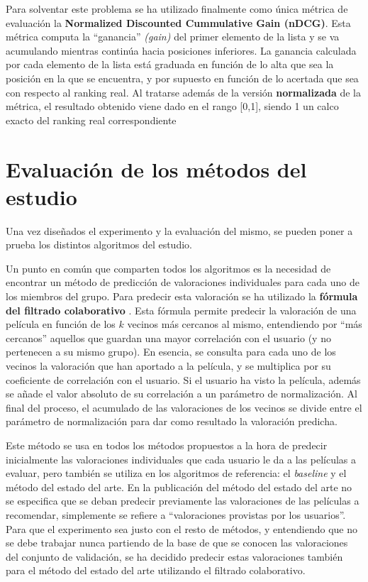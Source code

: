 Para solventar este problema se ha utilizado finalmente como única métrica de evaluación la \textbf{Normalized Discounted Cummulative Gain (nDCG)}. Esta métrica computa la ``ganancia'' \textit{(gain)} del primer elemento de la lista y se va acumulando mientras continúa hacia posiciones inferiores. La ganancia calculada por cada elemento de la lista está graduada en función de lo alta que sea la posición en la que se encuentra, y por supuesto en función de lo acertada que sea con respecto al ranking real. Al tratarse además de la versión \textbf{normalizada} de la métrica, el resultado obtenido viene dado en el rango [0,1], siendo 1 un calco exacto del ranking real correspondiente

\section{Evaluación de los métodos del estudio}

Una vez diseñados el experimento y la evaluación del mismo, se pueden poner a prueba los distintos algoritmos del estudio.

Un punto en común que comparten todos los algoritmos es la necesidad de encontrar un método de predicción de valoraciones individuales para cada uno de los miembros del grupo. Para predecir esta valoración se ha utilizado la \textbf{fórmula del filtrado colaborativo} \cite{recuperacion-informacion}. Esta fórmula permite predecir la valoración de una película en función de los $k$ vecinos más cercanos al mismo, entendiendo por ``más cercanos'' aquellos que guardan una mayor correlación con el usuario (y no pertenecen a su mismo grupo). En esencia, se consulta para cada uno de los vecinos la valoración que han aportado a la película, y se multiplica por su coeficiente de correlación con el usuario. Si el usuario ha visto la película, además se añade el valor absoluto de su correlación a un parámetro de normalización. Al final del proceso, el acumulado de las valoraciones de los vecinos se divide entre el parámetro de normalización para dar como resultado la valoración predicha.

Este método se usa en todos los métodos propuestos a la hora de predecir inicialmente las valoraciones individuales que cada usuario le da a las películas a evaluar, pero también se utiliza en los algoritmos de referencia: el \textit{baseline} y el método del estado del arte. En la publicación del método del estado del arte \cite{pogrs} no se especifica que se deban predecir previamente las valoraciones de las películas a recomendar, simplemente se refiere a ``valoraciones provistas por los usuarios''. Para que el experimento sea justo con el resto de métodos, y entendiendo que no se debe trabajar nunca partiendo de la base de que se conocen las valoraciones del conjunto de validación, se ha decidido predecir estas valoraciones también para el método del estado del arte utilizando el filtrado colaborativo.


